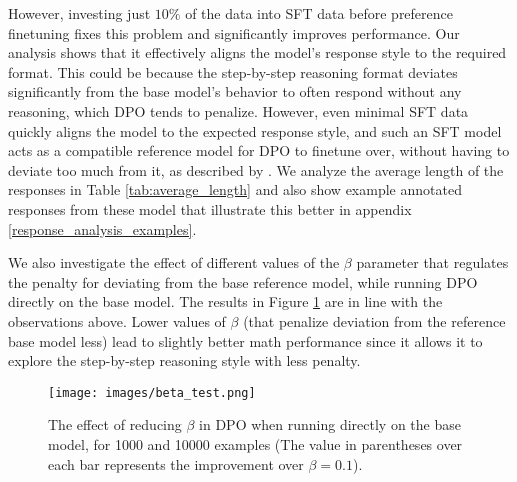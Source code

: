 However, investing just \(10\%\) of the data into SFT data before preference finetuning fixes this problem and significantly improves performance. Our analysis shows that it effectively aligns the model's response style to the required format. This could be because the step-by-step reasoning format deviates significantly from the base model's behavior to often respond without any reasoning, which DPO tends to penalize. However, even minimal SFT data quickly aligns the model to the expected response style, and such an SFT model acts as a compatible reference model for DPO to finetune over, without having to deviate too much from it, as described by \citet{liu2024understandingreferencepoliciesdirect}. We analyze the average length of the responses in Table \ref{tab:average_length} and also show example annotated responses from these model that illustrate this better in appendix \ref{response_analysis_examples}. 

We also investigate the effect of different values of the $\beta$ parameter that regulates the penalty for deviating from the base reference model, while running DPO directly on the base model. The results in Figure \ref{fig:beta_test} are in line with the observations above. Lower values of $\beta$ (that penalize deviation from the reference base model less) lead to slightly better math performance since it allows it to explore the step-by-step reasoning style with less penalty.


\begin{figure}
    \centering
    \texttt{[image: images/beta\_test.png]}
    \caption{The effect of reducing $\beta$ in DPO when running directly on the base model, for 1000 and 10000 examples (The value in parentheses over each bar represents the improvement over $\beta=0.1$).
        }
    \label{fig:beta_test}
\end{figure}



\subsection{\RQThree}

\label{cost_ratio}

